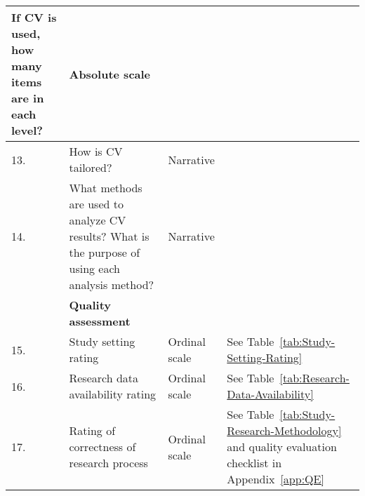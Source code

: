\begin{table}
{\begin{tabular}{|>{\raggedright}p{}|>{\raggedright}p{}|>{\centering}p{}|>{\centering}p{}|}
If CV is used, how many items are in each level? & Absolute scale & \tabularnewline
\hline 
13. & How is CV tailored? & Narrative & \tabularnewline
\hline 
14. & What methods are used to analyze CV results? What is the purpose of
using each analysis method? & Narrative & \tabularnewline
\hline 
 & \textbf{Quality assessment} &  & \tabularnewline
\hline 
15. & Study setting rating & Ordinal scale & See Table~\ref{tab:Study-Setting-Rating}\tabularnewline
\hline 
16. & Research data availability rating & Ordinal scale & See Table~\ref{tab:Research-Data-Availability}\tabularnewline
\hline 
17. & Rating of correctness of research process & Ordinal scale & See Table~\ref{tab:Study-Research-Methodology} and quality evaluation checklist in Appendix~\ref{app:QE}
\tabularnewline
\hline

\end{tabular}
}
\end{table}